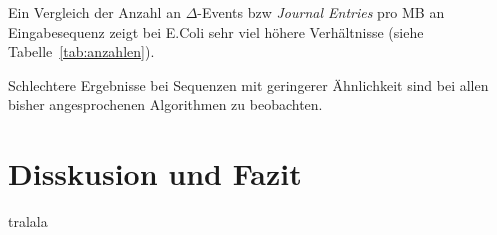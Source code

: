 \documentclass[12pt]{article}
\begin{document}
Ein Vergleich der Anzahl an $\Delta$-Events bzw \textit{Journal Entries} pro MB an Eingabesequenz zeigt bei E.Coli sehr viel höhere Verhältnisse (siehe Tabelle~\ref{tab:anzahlen}).

Schlechtere Ergebnisse bei Sequenzen mit geringerer Ähnlichkeit sind bei allen bisher angesprochenen Algorithmen zu beobachten.
\pagebreak
\section{Disskusion und Fazit}
tralala
\pagebreak

\end{document}
